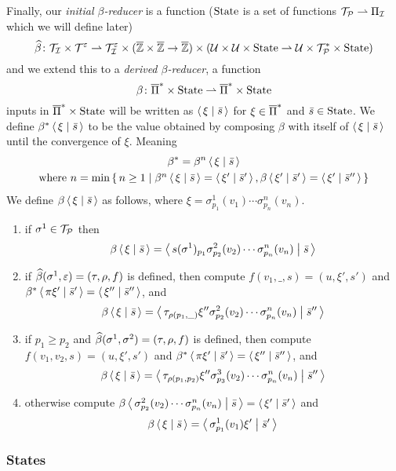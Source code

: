 \documentclass{llncs}
\begin{document}
Finally, our \textit{initial $\beta$-reducer} is a function ($\mathrm{State}$ is a set of functions $\mathcal T_{\mathcal P}\rightharpoonup\Pi_{\mathcal I}$ which we will define later)
\[ \widehat\beta\colon\mathcal T_{\mathcal I}\times\mathcal T^\varepsilon \rightharpoonup \mathcal T_{\mathcal I}^\varepsilon\times(\overline{\mathbb Z}\times\overline{\mathbb Z}\to\overline{\mathbb Z})\times(\mathcal U\times\mathcal U\times\mathrm{State}\rightharpoonup\mathcal U\times\mathcal T_{\mathcal P}^*\times\mathrm{State}) \]
and we extend this to a \textit{derived $\beta$-reducer}, a function
\[ \beta\colon\overline{\Pi}^*\times\mathrm{State} \rightharpoonup \overline{\Pi}^*\times\mathrm{State} \]
inputs in $\overline{\Pi}^*\times\mathrm{State}$ will be written as $\gen\xi[\bar s]$ for $\xi\in\overline{\Pi}^*$ and $\bar s\in\mathrm{State}$.
We define $\beta^*\gen\xi[\bar s]$ to be the value obtained by composing $\beta$ with itself of $\gen\xi[\bar s]$ until the convergence of $\xi$.
Meaning
\begin{multline*}
    \beta^* = \beta^n\gen\xi[\bar s]\\
    \hbox{where $n=\min\set{n\geq1}[{\beta^n\gen\xi[\bar s]=\gen{\xi'}[\bar s'],\beta\gen{\xi'}[\bar s']=\gen{\xi'}[\bar s'']}]$}
\end{multline*}
We define $\beta\gen\xi[\bar s]$ as follows, where $\xi=\sigma^1_{p_1}(v_1)\cdots\sigma^n_{p_n}(v_n)$.
\begin{enumerate}
    \item if $\sigma^1\in\mathcal T_{\mathcal P}$ then
    \[ \beta\gen\xi[\bar s] = \gen{s(\sigma^1)_{p_1}\sigma^2_{p_2}(v_2)\cdots\sigma^n_{p_n}(v_n)}[\bar s] \]
    \item if $\widehat\beta(\sigma^1,\varepsilon)=(\tau,\rho,f)$ is defined, then compute $f(v_1,\_,s)=(u,\xi',s')$ and $\beta^*\gen{\pi\xi'}[\bar s']=\gen{\xi''}[\bar s'']$, and
    \[ \beta\gen\xi[\bar s] = \gen{\tau_{\rho(p_1,\_)}\xi''\sigma^2_{p_2}(v_2)\cdots\sigma^n_{p_n}(v_n)}[\bar s''] \]
    \item if $p_1\geq p_2$ and $\widehat\beta(\sigma^1,\sigma^2)=(\tau,\rho,f)$ is defined, then compute $f(v_1,v_2,s)=(u,\xi',s')$ and $\beta^*\gen{\pi\xi'}[\bar s']=\gen{\xi''}[\bar s'']$, and
    \[ \beta\gen\xi[\bar s] = \gen{\tau_{\rho(p_1,p_2)}\xi''\sigma^3_{p_3}(v_2)\cdots\sigma^n_{p_n}(v_n)}[\bar s''] \]
    \item otherwise compute $\beta\gen{\sigma^2_{p_2}(v_2)\cdots\sigma^n_{p_n}(v_n)}[\bar s]=\gen{\xi'}[\bar s']$ and
    \[ \beta\gen\xi[\bar s] = \gen{\sigma^1_{p_1}(v_1)\xi'}[\bar s'] \]
\end{enumerate}

\subsubsection{States}
\end{document}
